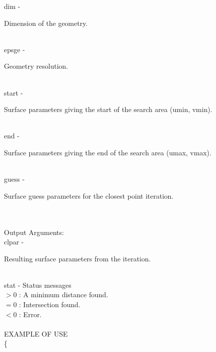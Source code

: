         \>\>    {\fov dim}\> - \>  \begin{minipg2}
                     Dimension of the geometry.
                               \end{minipg2}\\
        \>\>    {\fov epsge}\> - \>  \begin{minipg2}
                     Geometry resolution.
                               \end{minipg2}\\
        \>\>    {\fov start}\> - \>  \begin{minipg2}
                     Surface parameters giving the start of the search
                        area (umin, vmin).
                               \end{minipg2}\\
        \>\>    {\fov end}\> - \>  \begin{minipg2}
                     Surface parameters giving the end of the search
                        area (umax, vmax).
                               \end{minipg2}\\
        \>\>    {\fov guess}\> - \>  \begin{minipg2}
                     Surface guess parameters for the closest point
                        iteration.
                               \end{minipg2}\\
\\
	\>Output Arguments:\\
        \>\>    {\fov clpar}\> - \>  \begin{minipg2}
                     Resulting surface parameters from the iteration.
                               \end{minipg2}\\
        \>\>    {\fov stat}     \> - \> Status messages\\
                \>\>\>\>\>              $> 0$   : A minimum distance found.\\
                \>\>\>\>\>              $= 0$   : Intersection found.\\
                \>\>\>\>\>              $< 0$   : Error.\\
\\
EXAMPLE OF USE\\
		\>      \{ \\

